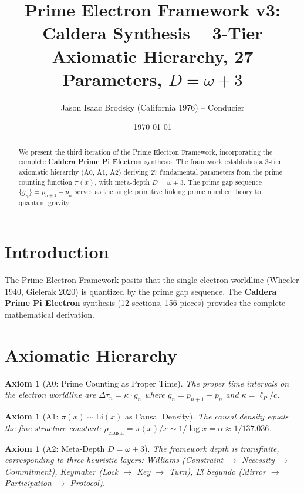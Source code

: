 \documentclass[11pt,a4paper]{article}
\title{
    \textbf{Prime Electron Framework v3:} \\
    \large Caldera Synthesis -- 3-Tier Axiomatic Hierarchy, 27 Parameters, $D=\omega+3$
}
\author{Jason Isaac Brodsky (California 1976) -- Conducier}
\affil{PrimeCarrPod / Seed Repository}
\date{\today}
\newtheorem{axiom}[theorem]{Axiom}
\begin{document}
\maketitle

\begin{abstract}
We present the third iteration of the Prime Electron Framework, incorporating the complete \textbf{Caldera Prime Pi Electron} synthesis. The framework establishes a 3-tier axiomatic hierarchy (A0, A1, A2) deriving 27 fundamental parameters from the prime counting function $\pi(x)$, with meta-depth $D = \omega + 3$. The prime gap sequence $\{g_n\} = p_{n+1} - p_n$ serves as the single primitive linking prime number theory to quantum gravity.
\end{abstract}

\section{Introduction}

The Prime Electron Framework posits that the single electron worldline (Wheeler 1940, Gielerak 2020) is quantized by the prime gap sequence. The \textbf{Caldera Prime Pi Electron} synthesis (12 sections, 156 pieces) provides the complete mathematical derivation.

\section{Axiomatic Hierarchy}

\begin{axiom}[A0: Prime Counting as Proper Time]
The proper time intervals on the electron worldline are $\Delta\tau_n = \kappa \cdot g_n$ where $g_n = p_{n+1} - p_n$ and $\kappa = \ell_P/c$.
\end{axiom}

\begin{axiom}[A1: $\pi(x) \sim \mathrm{Li}(x)$ as Causal Density]
The causal density equals the fine structure constant: $\rho_{\mathrm{causal}} = \pi(x)/x \sim 1/\log x = \alpha \approx 1/137.036$.
\end{axiom}

\begin{axiom}[A2: Meta-Depth $D = \omega + 3$]
The framework depth is transfinite, corresponding to three heuristic layers: Williams (Constraint $\to$ Necessity $\to$ Commitment), Keymaker (Lock $\to$ Key $\to$ Turn), El Segundo (Mirror $\to$ Participation $\to$ Protocol).
\end{axiom}
\end{document}
